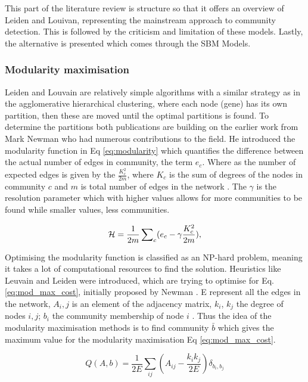 This part of the literature review is structure so that it offers an overview of Leiden and Louivan, representing the mainstream approach to community detection. This is followed by the criticism and limitation of these models. Lastly, the alternative is presented which comes through the SBM Models.


\subsubsection{Modularity maximisation}

Leiden and Louvain \citet{Traag2019-ne,Blondel2008-ik} are relatively simple algorithms with a similar strategy as in the agglomerative hierarchical clustering, where each node (gene) has its own partition, then these are moved until the optimal partitions is found. 
To determine the partitions both publications are building on the earlier work from Mark Newman who had numerous contributions to the field. He introduced the modularity function in Eq \ref{eq:modularity} \citet{Newman2004-dd} which quantifies the difference between the actual number of edges in community, the term $e_c$. Where as the number of expected edges is given by the $\frac{K_c^2}{2m}$, where $K_c$ is the sum of degrees of the nodes in community $c$ and $m$ is total number of edges in the network \cite{Traag2019-ne}. The $\gamma$ is the resolution parameter which with higher values allows for more communities to be found while smaller values, less communities.

\begin{equation} \label{eq:modularity}
    {\mathcal H} =\frac{1}{2m}\,{\sum }_{c}({e}_{c}-{\rm{\gamma }}\frac{{K}_{c}^{2}}{2m}),
\end{equation}


Optimising the modularity function is classified as an NP-hard problem, meaning it takes a lot of computational resources to find the solution. Heuristics like Leuvain and Leiden were introduced, which are trying to optimise for Eq. \ref{eq:mod_max_cost}, initially proposed by Newman \cite{Newman2006-fa}. E represent all the edges in the network, $A_i,j$ is an element of the adjacency matrix, $k_i$, $k_j$ the degree of nodes $i,j$; $b_i$ the community membership of node $i$ \cite{Peixoto2021-jx}. Thus the idea of the modularity maximisation methods is to find community $\bar{b}$ which gives the maximum value for the modularity maximisation Eq \ref{eq:mod_max_cost}.

\begin{equation} \label{eq:mod_max_cost}
    Q(A,b) = \frac{1}{2E} \sum_{ij} \left( A_{ij} - \frac{k_i k_j}{2E} \right) \delta_{b_i, b_j}
\end{equation}

